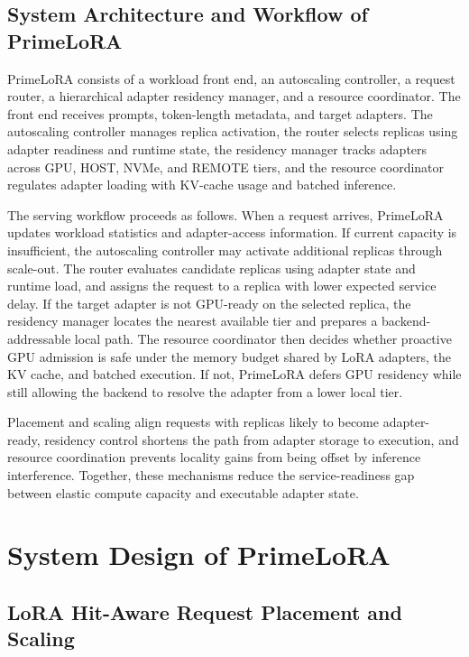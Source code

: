 \documentclass[lettersize,journal]{IEEEtran}
\begin{document}
\subsection{System Architecture and Workflow of PrimeLoRA}

PrimeLoRA consists of a workload front end, an autoscaling controller, a request router, a hierarchical adapter residency manager, and a resource coordinator. The front end receives prompts, token-length metadata, and target adapters. The autoscaling controller manages replica activation, the router selects replicas using adapter readiness and runtime state, the residency manager tracks adapters across GPU, HOST, NVMe, and REMOTE tiers, and the resource coordinator regulates adapter loading with KV-cache usage and batched inference.

The serving workflow proceeds as follows. When a request arrives, PrimeLoRA updates workload statistics and adapter-access information. If current capacity is insufficient, the autoscaling controller may activate additional replicas through scale-out. The router evaluates candidate replicas using adapter state and runtime load, and assigns the request to a replica with lower expected service delay. If the target adapter is not GPU-ready on the selected replica, the residency manager locates the nearest available tier and prepares a backend-addressable local path. The resource coordinator then decides whether proactive GPU admission is safe under the memory budget shared by LoRA adapters, the KV cache, and batched execution. If not, PrimeLoRA defers GPU residency while still allowing the backend to resolve the adapter from a lower local tier.

Placement and scaling align requests with replicas likely to become adapter-ready, residency control shortens the path from adapter storage to execution, and resource coordination prevents locality gains from being offset by inference interference. Together, these mechanisms reduce the service-readiness gap between elastic compute capacity and executable adapter state.

\section{System Design of PrimeLoRA}

\subsection{LoRA Hit-Aware Request Placement and Scaling}
\end{document}
